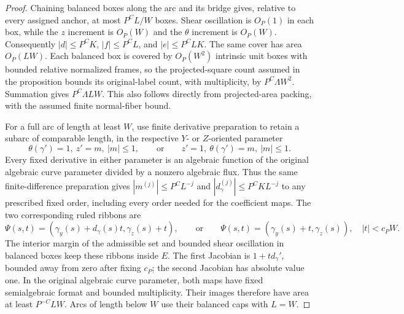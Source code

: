 \documentclass[11pt]{amsart}
\theoremstyle{definition}
\theoremstyle{remark}
\numberwithin{equation}{section}
\begin{document}
\begin{proof}
Chaining balanced boxes along the arc and its bridge gives, relative to every assigned anchor, at most $P^C L/W$ boxes. Shear oscillation is $O_P(1)$ in each box, while the $z$ increment is $O_P(W)$ and the $\theta$ increment is $O_P(W)$. Consequently $|d|\le P^CK$, $|f|\le P^CL$, and $|e|\le P^CLK$. The same cover has area $O_P(LW)$. Each balanced box is covered by $O_P(W^2)$ intrinsic unit boxes with bounded relative normalized frames, so the projected-square count assumed in the proposition bounds its original-label count, with multiplicity, by $P^C\Lambda W^2$. Summation gives $P^C\Lambda LW$. This also follows directly from projected-area packing, with the assumed finite normal-fiber bound.

For a full arc of length at least $W$, use finite derivative preparation to retain a subarc of comparable length, in the respective $Y$- or $Z$-oriented parameter
\[
\theta(\gamma')=1,\ z'=m,\ |m|\le1,\qquad\text{or}\qquad z'=1,\ \theta(\gamma')=m,\ |m|\le1.
\]
Every fixed derivative in either parameter is an algebraic function of the original algebraic curve parameter divided by a nonzero algebraic flux. Thus the same finite-difference preparation gives $|m^{(j)}|\le P^CL^{-j}$ and $|d_\gamma^{(j)}|\le P^CKL^{-j}$ to any prescribed fixed order, including every order needed for the coefficient maps. The two corresponding ruled ribbons are
\[
\Psi(s,t)=(\gamma_y(s)+d_\gamma(s)t,\gamma_z(s)+t),\qquad\text{or}\qquad\Psi(s,t)=(\gamma_y(s)+t,\gamma_z(s)),\quad |t|<c_PW.
\]
The interior margin of the admissible set and bounded shear oscillation in balanced boxes keep these ribbons inside $E$. The first Jacobian is $1+t d_\gamma'$, bounded away from zero after fixing $c_P$; the second Jacobian has absolute value one. In the original algebraic curve parameter, both maps have fixed semialgebraic format and bounded multiplicity. Their images therefore have area at least $P^{-C}LW$. Arcs of length below $W$ use their balanced caps with $L=W$.


\end{proof}
\end{document}

